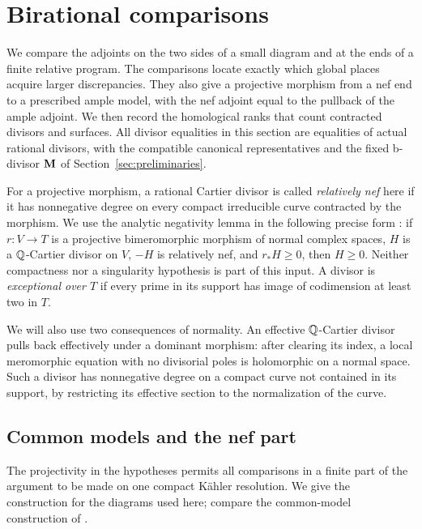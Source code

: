 \section{Birational comparisons}
\label{sec:comparisons}

We compare the adjoints on the two sides of a small diagram and at the
ends of a finite relative program.  The comparisons locate exactly which
global places acquire larger discrepancies.  They also give a projective
morphism from a nef end to a prescribed ample model, with the nef adjoint
equal to the pullback of the ample adjoint.  We then record the homological
ranks that count contracted divisors and surfaces.
All divisor equalities in this section are equalities of actual rational
divisors, with the compatible canonical representatives and the fixed
b-divisor $\mathbf{M}$ of Section~\ref{sec:preliminaries}.

For a projective morphism, a rational Cartier divisor is called
\emph{relatively nef} here if it has nonnegative degree on every compact
irreducible curve contracted by the morphism.  We use the analytic
negativity lemma in the following precise form
\cite[Lemma~2.2]{CanonicalKahler}: if $r:V\to T$ is a projective
bimeromorphic morphism of normal complex spaces, $H$ is a
$\mathbb{Q}$-Cartier divisor on $V$, $-H$ is relatively nef, and $r_*H\geq0$,
then $H\geq0$.  Neither compactness nor a singularity hypothesis is
part of this input.  A divisor is \emph{exceptional over $T$} if every
prime in its support has image of codimension at least two in $T$.

We will also use two consequences of normality.  An effective
$\mathbb{Q}$-Cartier divisor pulls back effectively under a dominant morphism:
after clearing its index, a local meromorphic equation with no
divisorial poles is holomorphic on a normal space.  Such a divisor has
nonnegative degree on a compact curve not contained in its support,
by restricting its effective section to the normalization of the curve.

\subsection{Common models and the nef part}

The projectivity in the hypotheses permits all comparisons in a finite
part of the argument to be made on one compact K\"ahler resolution.
We give the construction for the diagrams used here; compare the
common-model construction of \cite[Proposition~2.1]{CanonicalKahler}.

